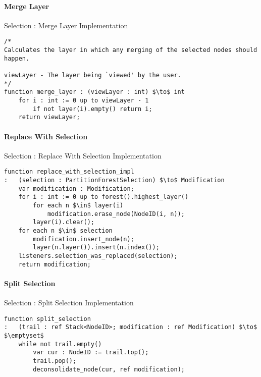 \paragraph{Merge Layer}

\begin{stulisting}[H]
\caption{Selection : Merge Layer Implementation}
\begin{lstlisting}[style=Default]
/*
Calculates the layer in which any merging of the selected nodes should happen.

viewLayer - The layer being `viewed' by the user.
*/
function merge_layer : (viewLayer : int) $\to$ int
	for i : int := 0 up to viewLayer - 1
		if not layer(i).empty() return i;
	return viewLayer;
\end{lstlisting}
\end{stulisting}

\paragraph{Replace With Selection}

\begin{stulisting}[H]
\caption{Selection : Replace With Selection Implementation}
\begin{lstlisting}[style=Default]
function replace_with_selection_impl
:	(selection : PartitionForestSelection) $\to$ Modification
	var modification : Modification;
	for i : int := 0 up to forest().highest_layer()
		for each n $\in$ layer(i)
			modification.erase_node(NodeID(i, n));
		layer(i).clear();
	for each n $\in$ selection
		modification.insert_node(n);
		layer(n.layer()).insert(n.index());
	listeners.selection_was_replaced(selection);
	return modification;
\end{lstlisting}
\end{stulisting}

\paragraph{Split Selection}

\begin{stulisting}[H]
\caption{Selection : Split Selection Implementation}
\begin{lstlisting}[style=Default]
function split_selection
:	(trail : ref Stack<NodeID>; modification : ref Modification) $\to$ $\emptyset$
	while not trail.empty()
		var cur : NodeID := trail.top();
		trail.pop();
		deconsolidate_node(cur, ref modification);
\end{lstlisting}
\end{stulisting}

